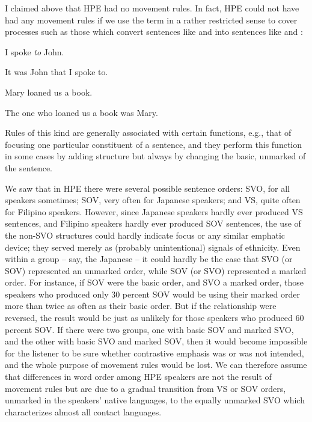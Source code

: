 I claimed above that HPE had no movement rules. In fact, HPE could not have had any movement rules if we use the term in a rather restricted sense to cover processes such as those which convert sentences like  and  into sentences like  and :

\ea\label{ex:17}
 I spoke \textit{to} John.
\z

\ea\label{ex:18}
 It was John that I spoke to.
\glt 
\z

\ea\label{ex:19}
 Mary loaned us a book.
\glt 
\z

\ea\label{ex:20}
 The one who loaned us a book was Mary.
\glt 
\z

Rules of this kind are generally associated with certain functions, e.g.,
that of focusing one particular constituent of a sentence, and they perform this function in some  cases by adding structure but always by changing the basic, unmarked  of the sentence.

We saw that in HPE there were several possible sentence orders: SVO, for all speakers sometimes; SOV, very often for Japanese speak\-ers; and VS, quite often for Filipino speakers. However, since Japanese speakers hardly ever produced VS sentences, and Filipino speakers hardly ever produced SOV sentences, the use of the non-SVO structures could hardly indicate focus or any similar emphatic device; they served merely as (probably unintentional) signals of ethnicity. Even within a group -- say, the Japanese -- it could hardly be the case that SVO (or SOV) represented an unmarked order, while SOV (or SVO) represented a marked order. For instance, if SOV were the basic order, and SVO a marked order, those speakers who produced only 30 percent SOV would be using their marked order more than twice as often as their basic order. But if the relationship were reversed, the result would be just as unlikely for those speakers who produced 60 percent SOV. If there were two groups, one with basic SOV and marked SVO, and the other with basic SVO and marked SOV, then it would become impossible for the listener to be sure whether contrastive emphasis was or was not intended, and the whole purpose of movement rules would be lost. We can therefore assume that differences in word order among HPE speakers are not the result of movement rules but are due to a gradual transition from VS or SOV orders, unmarked in the speakers' native languages, to the equally unmarked SVO which characterizes almost all contact languages.

